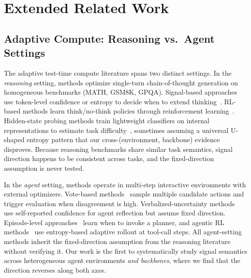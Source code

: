 \appendix

\section{Extended Related Work}
\label{app:related}

\subsection{Adaptive Compute: Reasoning vs.\ Agent Settings}

The adaptive test-time compute literature spans two distinct
settings. In the \emph{reasoning} setting, methods optimize
single-turn chain-of-thought generation on homogeneous benchmarks
(MATH, GSM8K, GPQA).
Signal-based approaches use token-level confidence or entropy to
decide when to extend
thinking~\cite{seag2025, cats2025, corefine2026,
thinkjustenough2025, s1_2025, han2025tokenbudget}.
RL-based methods learn think/no-think policies through reinforcement
learning~\cite{adaptthink2025, thinkless2025, aggarwal2025l1}.
Hidden-state probing methods train lightweight classifiers on
internal representations to estimate task
difficulty~\cite{diffadapt2025, zhu2025llmalreadyknows},
sometimes assuming a universal U-shaped entropy pattern
that our cross-(environment, backbone) evidence disproves.
Because reasoning benchmarks share similar task semantics, signal
direction happens to be consistent across tasks, and the
fixed-direction assumption is never tested.

In the \emph{agent} setting, methods operate in multi-step
interactive environments with external optimizers. Vote-based
methods~\cite{catts2026, corefine2026} sample multiple candidate
actions and trigger evaluation when disagreement is high.
Verbalized-uncertainty methods~\cite{auq2026} use self-reported
confidence for agent reflection but assume fixed direction.
Episode-level approaches~\cite{paglieri2025learning} learn when
to invoke a planner, and agentic RL methods~\cite{arpo2025} use
entropy-based adaptive rollout at tool-call steps. All agent-setting
methods inherit the fixed-direction assumption from the reasoning
literature without verifying it. Our work is the first to
systematically study signal semantics across heterogeneous agent
environments \emph{and backbones}, where we find that the
direction reverses along both axes.

